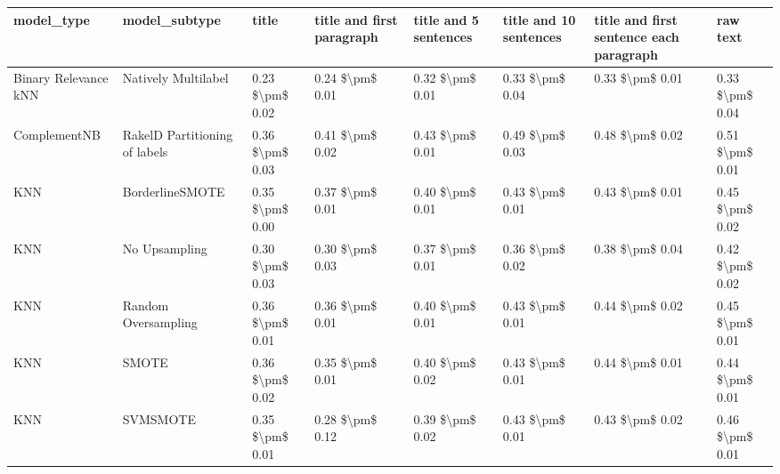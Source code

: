 \begin{tabular}{llllllll}
\toprule
                     model\_type &                 model\_subtype &           title & title and first paragraph & title and 5 sentences & title and 10 sentences & title and first sentence each paragraph &            raw text \\
\midrule
           Binary Relevance kNN &           Natively Multilabel & 0.23 \$\textbackslash pm\$ 0.02 &           0.24 \$\textbackslash pm\$ 0.01 &       0.32 \$\textbackslash pm\$ 0.01 &        0.33 \$\textbackslash pm\$ 0.04 &                         0.33 \$\textbackslash pm\$ 0.01 &     0.33 \$\textbackslash pm\$ 0.04 \\
                   ComplementNB & RakelD Partitioning of labels & 0.36 \$\textbackslash pm\$ 0.03 &           0.41 \$\textbackslash pm\$ 0.02 &       0.43 \$\textbackslash pm\$ 0.01 &        0.49 \$\textbackslash pm\$ 0.03 &                         0.48 \$\textbackslash pm\$ 0.02 &     0.51 \$\textbackslash pm\$ 0.01 \\
                            KNN &               BorderlineSMOTE & 0.35 \$\textbackslash pm\$ 0.00 &           0.37 \$\textbackslash pm\$ 0.01 &       0.40 \$\textbackslash pm\$ 0.01 &        0.43 \$\textbackslash pm\$ 0.01 &                         0.43 \$\textbackslash pm\$ 0.01 &     0.45 \$\textbackslash pm\$ 0.02 \\
                            KNN &                 No Upsampling & 0.30 \$\textbackslash pm\$ 0.03 &           0.30 \$\textbackslash pm\$ 0.03 &       0.37 \$\textbackslash pm\$ 0.01 &        0.36 \$\textbackslash pm\$ 0.02 &                         0.38 \$\textbackslash pm\$ 0.04 &     0.42 \$\textbackslash pm\$ 0.02 \\
                            KNN &           Random Oversampling & 0.36 \$\textbackslash pm\$ 0.01 &           0.36 \$\textbackslash pm\$ 0.01 &       0.40 \$\textbackslash pm\$ 0.01 &        0.43 \$\textbackslash pm\$ 0.01 &                         0.44 \$\textbackslash pm\$ 0.02 &     0.45 \$\textbackslash pm\$ 0.01 \\
                            KNN &                         SMOTE & 0.36 \$\textbackslash pm\$ 0.02 &           0.35 \$\textbackslash pm\$ 0.01 &       0.40 \$\textbackslash pm\$ 0.02 &        0.43 \$\textbackslash pm\$ 0.01 &                         0.44 \$\textbackslash pm\$ 0.01 &     0.44 \$\textbackslash pm\$ 0.01 \\
                            KNN &                      SVMSMOTE & 0.35 \$\textbackslash pm\$ 0.01 &           0.28 \$\textbackslash pm\$ 0.12 &       0.39 \$\textbackslash pm\$ 0.02 &        0.43 \$\textbackslash pm\$ 0.01 &                         0.43 \$\textbackslash pm\$ 0.02 &     0.46 \$\textbackslash pm\$ 0.01 \\

\end{tabular}
